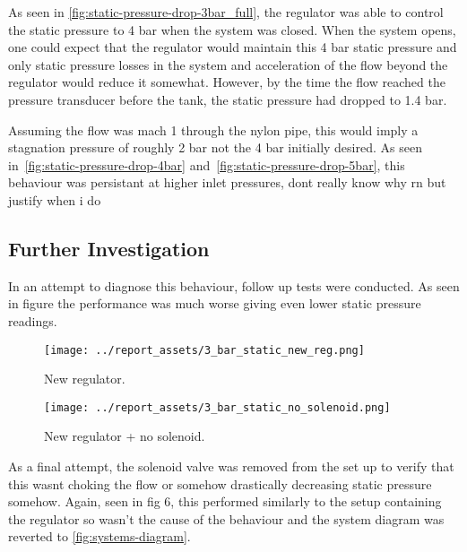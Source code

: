 As seen in \autoref{fig:static-pressure-drop-3bar_full}, the regulator was able to control the static pressure to 4 bar when the system was closed. When the system opens, one could expect that the regulator would maintain this 4 bar static pressure and only static pressure losses in the system and acceleration of the flow beyond the regulator would reduce it somewhat. However, by the time the flow reached the pressure transducer before the tank, the static pressure had dropped to 1.4 bar. 

Assuming the flow was mach 1 through the nylon pipe, this would imply a stagnation pressure of roughly 2 bar not the 4 bar initially desired. As seen in~\autoref{fig:static-pressure-drop-4bar} and~\autoref{fig:static-pressure-drop-5bar}, this behaviour was persistant at higher inlet pressures, dont really know why rn but justify when i do

\subsection{Further Investigation}
In an attempt to diagnose this behaviour, follow up tests were conducted. As seen in figure the performance was much worse giving even lower static pressure readings. 
\begin{figure}[htbp]
    \centering

    \begin{minipage}{0.45\textwidth}
        \centering
        \texttt{[image: ../report\_assets/3\_bar\_static\_new\_reg.png]}
        \caption{New regulator.}\label{fig:static-pressure-drop-new-reg}
    \end{minipage}
    \hfill
    \begin{minipage}{0.45\textwidth}
        \centering
        \texttt{[image: ../report\_assets/3\_bar\_static\_no\_solenoid.png]}
        \caption{New regulator + no solenoid.}\label{fig:static-pressure-drop-no-solenoid}
    \end{minipage}

\end{figure}
As a final attempt, the solenoid valve was removed from the set up to verify that this wasnt choking the flow or somehow drastically decreasing static pressure somehow. Again, seen in fig 6, this performed similarly to the setup containing the regulator so wasn't the cause of the behaviour and the system diagram was reverted to \autoref{fig:systems-diagram}.
